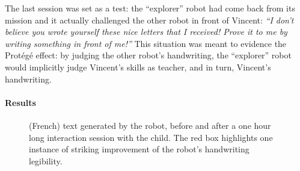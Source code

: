\documentclass{article}
\begin{document}
The last session was set as a test: the ``explorer'' robot
had come back from its mission and it actually challenged the other robot in
front of Vincent: \emph{``I don't believe you wrote yourself these nice letters that I
received! Prove it to me by writing something in front of me!''} This situation
was meant to evidence the Protégé effect: by judging the other robot's
handwriting, the ``explorer'' robot would implicitly judge Vincent's skills as
teacher, and in turn, Vincent's handwriting.

\paragraph{Results}

\begin{figure}
    \centering

    \caption{\small (French) text generated by the robot, before and after a one
        hour long interaction session with the child. The red box
        highlights one instance of striking improvement of the robot's
        handwriting legibility.}

    \label{fig:stimuli}
\end{figure}
\end{document}
